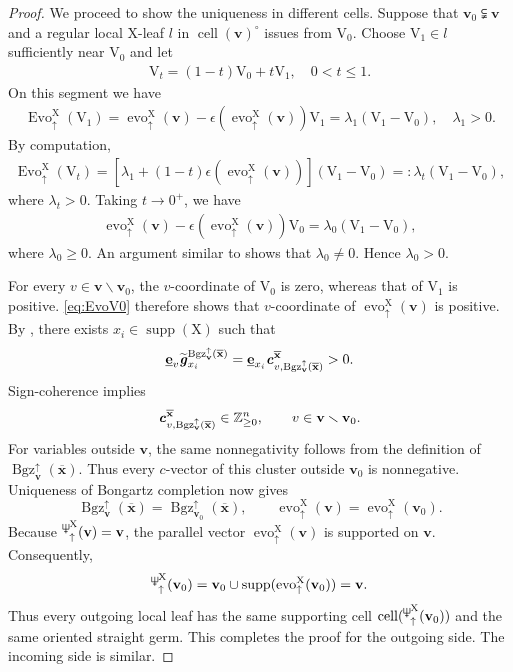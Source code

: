 \documentclass[11pt,reqno]{amsart}
\newcommand{\Neptune}{\mathord{\text{\tikz[baseline=-.5ex,scale=.13]{\draw[line width=.45pt] (0,0)--(0,1.8) (-.6,1.8)--(-.6,.8)--(.6,.8)--(.6,1.8) (-.35,.35)--(.35,.35);}}}}
\theoremstyle{plain}
\theoremstyle{definition}
\numberwithin{equation}{section}
\newcommand\ZZ{\mathbb{Z}}
\newcommand\<{\langle}
\renewcommand\>{\rangle}
\renewcommand{\setminus}{\smallsetminus}
\newcommand{\on}[1]{\operatorname{#1}}
\def\cc{\on{cell}}  %
\def\vv{\mathbf{v}}
\def\sink{X}
\newcommand{\flowu}[1]{\on{evo}^{#1}_{\uparrow}}
\newcommand{\flowU}[1]{\on{Evo}_{\uparrow}^{#1}}
\newcommand{\ccpt}[1]{\mathrm{#1}}%
\def\xevo{\ccpt{X}}%
\newcommand{\bfit}[1]{\textbf{\textit{#1}}}
\newcommand{\ubf}[1]{\underline{\mathbf{#1}}}
\def\xx{\mathbf{x}}%
\def\cvec{\bfit{c}}
\def\gvec{\bfit{g}}
\def\supp{\on{supp}}
\newcommand{\Bgzp}[2]{\operatorname{Bgz}^{\uparrow}_{#2}(#1)}
\newcommand{\suppu}[1]{\operatorname{\Neptune}_{\uparrow}^{#1}}
\newcommand{\ol}[1]{\overline{#1}}
\def\ZZp{\ZZ_{\ge0}}
\def\csum{\epsilon}
\def\tgvec{\widetilde{\gvec}}
\begin{document}
\begin{proof}
    We proceed to show the uniqueness in different cells.
    Suppose that $\vv_0\subsetneqq\vv$ and a regular local $\xevo$-leaf $l$ in $\cc(\vv)^\circ$ issues from $\ccpt{V}_0$.
    Choose $\ccpt{V}_1\in l$ sufficiently near $\ccpt{V}_0$ and let
    \begin{gather}
        \ccpt{V}_t=(1-t)\ccpt{V}_0+t\ccpt{V}_1,\quad 0<t\le1.
    \end{gather}
    On this segment we have
    \begin{gather}
        \flowU{\xevo}(\ccpt{V}_1)=
        \flowu{\xevo}(\vv)-\csum(\flowu{\xevo}(\vv))\ccpt{V}_1=
        \lambda_1(\ccpt{V}_1-\ccpt{V}_0),
        \quad\lambda_1>0.
    \end{gather}
    By computation,
    \begin{gather}
        \flowU{\xevo}(\ccpt{V}_t)=
        \left[
        \lambda_1+(1-t)\csum(\flowu{\xevo}(\vv))
        \right]
        (\ccpt{V}_1-\ccpt{V}_0)
        =\colon\lambda_t(\ccpt{V}_1-\ccpt{V}_0),
    \end{gather}
    where $\lambda_t>0$.
    Taking $t\to 0^+$, we have
    \begin{gather}\label{eq:EvoV0}
        \flowu{\xevo}(\vv)-\csum(\flowu{\xevo}(\vv))\ccpt{V}_0=
        \lambda_0(\ccpt{V}_1-\ccpt{V}_0),
    \end{gather}
    where $\lambda_0\ge0$.
    An argument similar to  shows that $\lambda_0\ne0$. 
    Hence $\lambda_0>0$.
    
    For every $v\in\vv\setminus\vv_0$, the $v$-coordinate of
    $\ccpt{V}_0$ is zero, whereas that of $\ccpt{V}_1$ is positive.
    \eqref{eq:EvoV0} therefore shows that $v$-coordinate of $\flowu{\xevo}(\vv)$ is positive.
    By , there exists $x_i\in\supp(\xevo)$ such that
    \[
    \ubf{e}_{v}\tgvec^{\Bgzp{\ol{\xx}}{\vv}}_{x_i}=\ubf{e}_{x_i}\cvec^{\ol{\xx}}_{v,\Bgzp{\ol{\xx}}{\vv}}>0.
    \]
    Sign-coherence implies
    \begin{gather}
        \cvec^{\ol{\xx}}_{v,\Bgzp{\ol{\xx}}{\vv}}\in\ZZp^n,\qquad
        v\in\vv\setminus\vv_0.
    \end{gather}
    For variables outside $\vv$, the same nonnegativity follows from the definition of $\Bgzp{\ol{\xx}}{\vv}$.
    Thus every $c$-vector of this cluster outside $\vv_0$ is nonnegative.
    Uniqueness of Bongartz completion now gives
    \[
        \Bgzp{\ol{\xx}}{\vv}
        =\Bgzp{\ol{\xx}}{\vv_0},
        \qquad
        \flowu{\xevo}(\vv)=\flowu{\xevo}(\vv_0).
    \]
    Because $\suppu{\xevo}(\vv)=\vv$, the parallel vector $\flowu{\xevo}(\vv)$ is supported on $\vv$.
    Consequently,
    \[
        \suppu{\xevo}(\vv_0)
        =
        \vv_0\cup\supp(\flowu{\xevo}(\vv_0))
        =\vv.
    \]
    Thus every outgoing local leaf has the same supporting cell $\cc(\suppu{\xevo}(\vv_0))$ and the same oriented straight germ.
    This completes the proof for the outgoing side.
    The incoming side is similar.
\end{proof}
\end{document}
